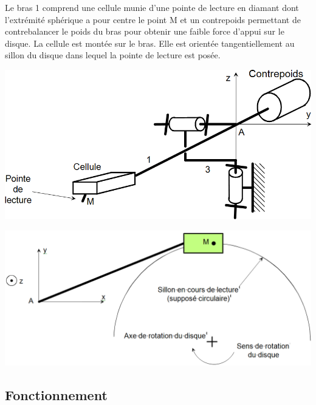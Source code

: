 \documentclass[10pt,fleqn]{article} %
\begin{document}

\vspace{7cm}
\pagestyle{fancy}
\thispagestyle{plain}


\def\columnseprulecolor{\color{ocre}}
\setlength{\columnseprule}{0.4pt} 

\begin{multicols}{2}

Le bras 1 comprend une cellule munie d'une pointe de lecture en diamant dont l'extrémité sphérique a pour centre le point M et un contrepoids permettant de contrebalancer le poids du bras pour obtenir une faible force d'appui sur le disque. La cellule est montée sur le bras. Elle est orientée tangentiellement au sillon du disque dans lequel la pointe de lecture est posée.


\begin{center}
\includegraphics[width=.95\linewidth]{images/fig3}
\end{center}

\begin{center}
\includegraphics[width=.95\linewidth]{images/fig4}
\end{center}



\subsection*{Fonctionnement}



\end{multicols}
\end{document}
